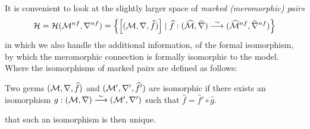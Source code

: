 It is convenient to look at the slightly larger space of \emph{marked
(meromorphic) pairs}
\[
  \mathcal{H}=\mathcal{H}(\mathcal{M}^{nf},\nabla^{nf})=\left\{
    \left[(\mathcal{M},\nabla,\widehat f)\right]
      \mid
      \widehat f:(\widehat{\mathcal{M}},\widehat\nabla)
        \overset{\sim}\longrightarrow
        (\widehat{\mathcal{M}}^{nf},\widehat\nabla^{nf})
  \right\}
\]
in which we also handle the additional information, of the formal isomorphism,
by which the meromorphic connection is formally isomorphic to the model.
Where the isomorphisms of marked pairs are defined as follows:
\begin{defn}
  Two germs $(\mathcal{M},\nabla,\widehat f)$ and $(\mathcal{M}',\nabla',\widehat f')$ are
  isomorphic if there exists an isomorphism
  $g:(\mathcal{M},\nabla)\overset{\sim}\longrightarrow(\mathcal{M}',\nabla')$ such that
  $\hat f=\hat f'\circ \hat g$.
  \begin{s-rem}
     \cite[111]{sabbah2007isomonodromic} that such
    an isomorphism is then unique.
  \end{s-rem}
\end{defn}

